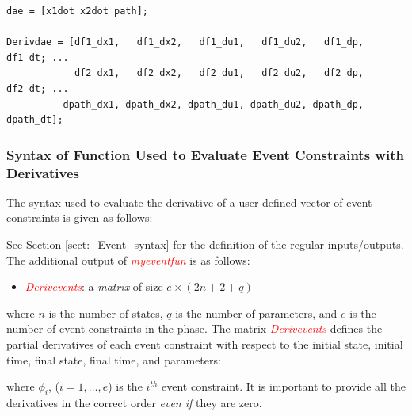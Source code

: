 \documentclass[10pt,final]{report}
\newenvironment{shadedframe}{%
  \def\FrameCommand{\fcolorbox{black}{shadecolor}}%
  \MakeFramed {\FrameRestore}}
{\endMakeFramed}
\newcommand{\slred}[1]{\textcolor{red}{\sl #1}}
\begin{document}
\begin{shadedframe}
\begin{verbatim}
dae = [x1dot x2dot path];

Derivdae = [df1_dx1,   df1_dx2,   df1_du1,   df1_du2,   df1_dp,   df1_dt; ...
            df2_dx1,   df2_dx2,   df2_du1,   df2_du2,   df2_dp,   df2_dt; ...
          dpath_dx1, dpath_dx2, dpath_du1, dpath_du2, dpath_dp, dpath_dt];
\end{verbatim}
\end{shadedframe}

\subsubsection{Syntax of Function Used to Evaluate Event Constraints with Derivatives}


The syntax used to evaluate the derivative of a user-defined vector of event constraints
is given as follows:
\begin{center}
\end{center}
See Section \ref{sect:_Event_syntax} for the definition of the regular inputs/outputs.  The additional output of \slred{myeventfun} is as follows:
\begin{itemize}
  \item \slred{Derivevents}: a {\em matrix} of size $e\times (2n+2+q)$
\end{itemize}
where $n$ is the number of states, $q$ is the number of parameters, and $e$ is the number of event constraints in the phase.  The matrix \slred{Derivevents} defines the partial derivatives of each event constraint with respect to the initial state, initial time, final state, final time, and parameters:
\begin{center}
\end{center}
where $\phi_i$, ($i = 1,\ldots,e$) is the $i^{th}$ event constraint. It is important to provide all the derivatives in the correct order {\em even if} they are zero.
\end{document}

